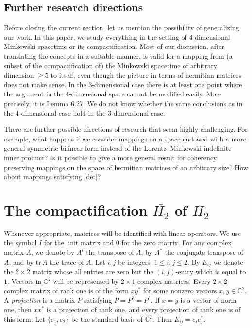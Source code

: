 \documentclass[10pt,a4paper]{amsart}
\providecommand{\index}[1]{}
\newcommand\oH{{\overline{H_2}}}
\theoremstyle{definition}
\theoremstyle{remark}
\numberwithin{subsection}{section}
\numberwithin{equation}{section}
\begin{document}
\subsection{Further research directions} 
Before closing the current section, let us mention the possibility of generalizing our work. 
In this paper, we study everything in the setting of $4$-dimensional Minkowski spacetime or its compactification. 
Most of our discussion, after translating the concepts in a suitable manner, is valid for a mapping from (a subset of the compactification of) the Minkowski spacetime of arbitrary dimension $\geq 5$ to itself, even though the picture in terms of hermitian matrices does not make sense.
In the $3$-dimensional case there is at least one point where the argument in the 4-dimensional space cannot be modified easily. 
More precisely, it is Lemma \href{https://arxiv.org/abs/2406.18874v2}{6.27}.
We do not know whether the same conclusions as in the 4-dimensional case hold in the 3-dimensional case.

There are further possible directions of research that seem highly challenging. 
For example, what happens if we consider mappings on a space endowed with a more general symmetric bilinear form instead of the Lorentz--Minkowski indefinite inner product?
Is it possible to give a more general result for coherency preserving mappings on the space of hermitian matrices of an arbitrary size?
How about mappings satisfying \eqref{det}?








\section{The compactification $\oH$ of $H_2$}\label{compactification}
Whenever appropriate, matrices will be identified with linear operators.
We use the symbol $I$ \index{$I$} for the unit matrix and $0$ for the zero matrix.
For any complex matrix $A$, we denote by $A^t$ \index{$A^t$} the transpose of $A$, by $A^\ast$ \index{$A^\ast$} the conjugate transpose of $A$, and by $\mathrm{tr}\, A$ \index{$trA$@$\mathrm{tr}\, A$} the trace of $A$. Let $i,j$ be integers,
$1 \le i,j \le 2$. By $E_{ij}$ \index{$E_{ij}$} we denote the $2 \times 2$ matrix whose all entries are zero but the $(i,j)$-entry which is equal to $1$.
Vectors in $\mathbb{C}^2$ will be represented by $2 \times 1$ complex matrices. Every $2 \times 2$ complex matrix of rank one is of the form $xy^\ast$ for some nonzero vectors
$x,y \in \mathbb{C}^2$. 
A \emph{projection} \index{projection} is a matrix $P$ satisfying $P=P^2=P^*$.
If $x = y$ is a vector of norm one, then $xx^\ast$ is a projection of rank one, and every projection of rank one is of this form. Let $\{ e_1 ,  e_2 \}$ be the standard basis of $\mathbb{C}^2$\index{$e_i$}. Then $E_{ij} = e_i e_{j}^\ast$.
\end{document}
